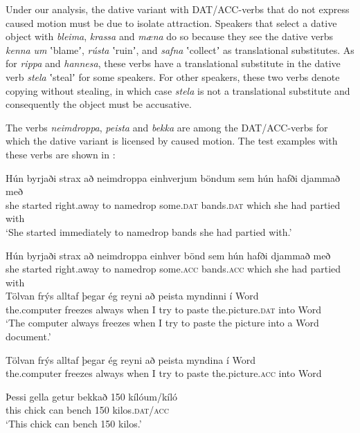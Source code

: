 \documentclass[output=paper,modfonts,nonflat]{langsci/langscibook}
\begin{document}
Under our analysis, the dative variant with DAT/ACC-verbs that do not express caused motion must be due to isolate attraction. Speakers that select a dative object with \textit{bleima}, \textit{krassa} and \textit{mæna} do so because they see the dative verbs \textit{kenna} \textit{um} ʽblameʼ, \textit{rústa} ʽruinʼ, and \textit{safna} ʽcollectʼ as translational substitutes. As for \textit{rippa} and \textit{hannesa}, these verbs have a translational substitute in the dative verb \textit{stela} ʽstealʼ for some speakers. For other speakers, these two verbs denote copying without stealing, in which case \textit{stela} is not a translational substitute and consequently the object must be accusative. 

The verbs \textit{neimdroppa}, \textit{peista} and \textit{bekka} are among the DAT/ACC-verbs for which the dative variant is licensed by caused motion. The test examples with these verbs are shown in :

 
\ea%
\label{ex:jonsson:7}
\ea\label{ex:jonsson:7a} 
\gll  Hún  byrjaði  strax  að  neimdroppa  einhverjum  böndum  sem  hún  hafði  djammað  með\\
   she  started  right.away  to  namedrop  some.\textsc{dat}  bands.\textsc{dat}  which  she  had  partied  with\\
\glt `She started immediately to namedrop bands she had partied with.'
 
 
\ex\label{ex:jonsson:7b}
\gll   Hún  byrjaði  strax  að  neimdroppa  einhver  bönd  sem  hún  hafði  djammað  með\\
 she  started  right.away  to  namedrop  some.\textsc{acc}  bands.\textsc{acc}  which  she  had  partied  with\\
 
 
\ex\label{ex:jonsson:7c}
\gll   Tölvan  frýs  alltaf  þegar  ég  reyni  að  peista  myndinni  í  Word  \\
 the.computer  freezes  always  when  I  try  to  paste  the.picture.\textsc{dat}  into  Word  \\
\glt `The computer always freezes when I try to paste the picture into a Word document.'
  
\ex\label{ex:jonsson:7d}
\gll   Tölvan  frýs  alltaf  þegar  ég  reyni  að  peista  myndina  í  Word\\
 the.computer  freezes  always  when  I  try  to  paste  the.picture.\textsc{acc}  into  Word\\
 

\ex\label{ex:jonsson:7e}
\gll   Þessi  gella  getur  bekkað  150  kílóum/kíló\\
 this  chick  can  bench  150  kilos.\textsc{dat/acc}\\
\glt `This chick can bench 150 kilos.'
\z
\z
\end{document}
